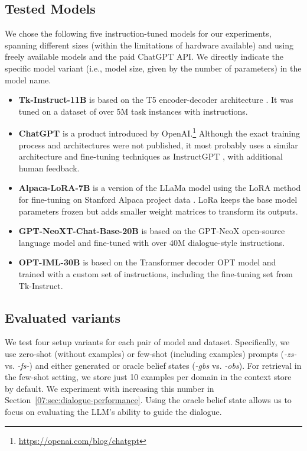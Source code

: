 \subsection{Tested Models}
We chose the following five instruction-tuned models for our experiments, spanning different sizes (within the limitations of hardware available) and using freely available models and the paid ChatGPT API.
We directly indicate the specific model variant (i.e., model size, given by the number of parameters) in the model name.
\label{07:sec:par:models}
\begin{itemize}
    \item \textbf{Tk-Instruct-11B} \cite{supernaturalinstructions} is based on the T5 encoder-decoder architecture \cite{2020t5}. It was tuned on a dataset of over 5M task instances with instructions.
    \item \textbf{ChatGPT} is a product introduced by OpenAI.\footnote{\url{https://openai.com/blog/chatgpt}} Although the exact training process and architectures were not published, it most probably uses a similar architecture and fine-tuning techniques as InstructGPT \cite{ouyang2022training}, with additional human feedback.
    \item \textbf{Alpaca-LoRA-7B} is a version of the LLaMa model \cite{touvron2023llama} using the LoRA method \cite{hu2021lora} for fine-tuning on Stanford Alpaca project data \cite{alpaca}. LoRa keeps the base model parameters frozen but adds smaller weight matrices to transform its outputs.
    \item \textbf{GPT-NeoXT-Chat-Base-20B} is based on the GPT-NeoX open-source language model \cite{black2022gpt} and fine-tuned with over 40M dialogue-style instructions.
    \item \textbf{OPT-IML-30B} \cite{iyer2022opt} is based on the Transformer decoder OPT model \cite{zhang2022opt} and trained with a custom set of instructions, including the fine-tuning set from Tk-Instruct.
\end{itemize}

\subsection{Evaluated variants}
We test four setup variants for each pair of model and dataset.
Specifically, we use zero-shot (without examples) or few-shot (including examples) prompts (\emph{-zs-} vs. \emph{-fs-}) and either generated or oracle belief states (\emph{-gbs} vs. \emph{-obs}).
For retrieval in the few-shot setting, we store just 10 examples per domain in the context store by default. We experiment with increasing this number in Section~\ref{07:sec:dialogue-performance}.
Using the oracle belief state allows us to focus on evaluating the LLM's ability to guide the dialogue.

